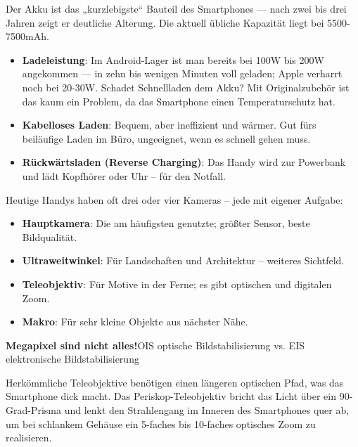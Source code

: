 
Der Akku ist das „kurzlebigste“ Bauteil des Smartphones — nach zwei bis drei Jahren zeigt er deutliche Alterung. Die aktuell übliche Kapazität liegt bei 5500-7500mAh.

\begin{itemize}
  \item \textbf{Ladeleistung}: Im Android-Lager ist man bereits bei 100W bis 200W angekommen — in zehn bis wenigen Minuten voll geladen; Apple verharrt noch bei 20-30W. Schadet Schnellladen dem Akku? Mit Originalzubehör ist das kaum ein Problem, da das Smartphone einen Temperaturschutz hat.
  \item \textbf{Kabelloses Laden}: Bequem, aber ineffizient und wärmer. Gut fürs beiläufige Laden im Büro, ungeeignet, wenn es schnell gehen muss.
  \item \textbf{Rückwärtsladen (Reverse Charging)}: Das Handy wird zur Powerbank und lädt Kopfhörer oder Uhr – für den Notfall.
\end{itemize}


Heutige Handys haben oft drei oder vier Kameras – jede mit eigener Aufgabe:

\begin{itemize}
  \item \textbf{Hauptkamera}: Die am häufigsten genutzte; größter Sensor, beste Bildqualität.
  \item \textbf{Ultraweitwinkel}: Für Landschaften und Architektur – weiteres Sichtfeld.
  \item \textbf{Teleobjektiv}: Für Motive in der Ferne; es gibt optischen und digitalen Zoom.
  \item \textbf{Makro}: Für sehr kleine Objekte aus nächster Nähe.
\end{itemize}

\textbf{Megapixel sind nicht alles!}OIS optische Bildstabilisierung vs. EIS elektronische Bildstabilisierung


Herkömmliche Teleobjektive benötigen einen längeren optischen Pfad, was das Smartphone dick macht. Das Periskop-Teleobjektiv bricht das Licht über ein 90-Grad-Prisma und lenkt den Strahlengang im Inneren des Smartphones quer ab, um bei schlankem Gehäuse ein 5-faches bis 10-faches optisches Zoom zu realisieren.

